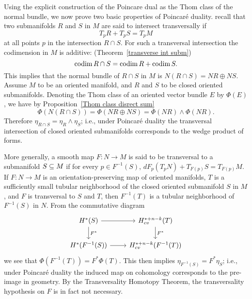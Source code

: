 Using the explicit construction of the Poincare dual as the Thom class of the normal bundle, we now prove two basic properties of Poincar\'e duality. recall that two 
submanifolds $R$ and $S$ in $M$ are said to intersect transversally if
\[T_pR+T_pS=T_pM\]
at all points $p$ in the intersection $R\cap S$. For such a transversal intersection the codimension in $M$ is additive: (Theorem~\ref{transverse int subm})
\[\mathrm{codim}\, R\cap S=\mathrm{codim}\, R+\mathrm{codim}\, S.\]
This implies that the normal bundle of $R\cap S$ in $M$ is $N(R\cap S)=NR\oplus NS$. Assume $M$ to be an oriented manifold, and $R$ and $S$ to be closed oriented 
submanifolds. Denoting the Thom class of an oriented vector bundle $E$ by $\Phi(E)$, we have by Proposition~\ref{Thom class disrect sum}
\[\Phi(N(R\cap S))=\Phi(NR\oplus NS)=\Phi(NR)\wedge\Phi(NR).\]
Therefore $\eta_{R\cap S}=\eta_R\wedge\eta_S$; i.e., under Poincar\'e duality the transversal intersection of closed oriented submanifolds corresponds to the wedge 
product of forms.\par
More generally, a smooth map $F:N\to M$ is said to be transversal to a submanifold $S\subseteq M$ if for every $p\in F^{-1}(S)$, $dF_p(T_pN)+T_{F(p)}S=T_{F(p)}M$. If 
$F:N\to M$ is an orientation-preserving map of oriented manifolds, $T$ is a sufficiently small tubular neighborhood of the closed oriented submanifold $S$ in $M$, and 
$F$ is transversal to $S$ and $T$, then $F^{-1}(T)$ is a tubular neighborhood of $F^{-1}(S)$ in $N$. From the commutative diagram
\[\begin{tikzcd}
H^*(S)\ar[r]\ar[d,"F^*"]&H^{*+n-k}_{cv}(T)\ar[d,"F^*"]\\
H^*(F^{-1}(S))\ar[r]&H^{*+n-k}_{cv}(F^{-1}(T))
\end{tikzcd}\]
we see that $\Phi(F^{-1}(T))=F^*\Phi(T)$. This then implies $\eta_{F^{-1}(S)}=F^*\eta_S$; i.e., under Poincar\'e duality the induced map on cohomology corresponds to 
the pre-image in geometry. By the Transversality Homotopy Theorem, the transversality hypothesis on $F$ is in fact not necessary.
